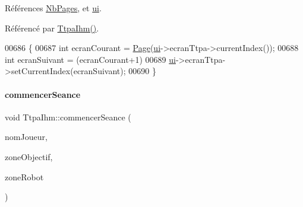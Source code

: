 Références \hyperlink{class_ttpa_ihm_aad886f2c7b90b4f990492092f0be9c2ba66041bd2f2e100691c4d94c918e92956}{Nb\+Pages}, et \hyperlink{class_ttpa_ihm_ad5fae1222a667da158c26f3d0f0dce23}{ui}.



Référencé par \hyperlink{class_ttpa_ihm_ab3ed4b37a93ff04842414d4a98861d66}{Ttpa\+Ihm()}.


\begin{DoxyCode}
00686 \{
00687     \textcolor{keywordtype}{int} ecranCourant = \hyperlink{class_ttpa_ihm_aad886f2c7b90b4f990492092f0be9c2b}{Page}(\hyperlink{class_ttpa_ihm_ad5fae1222a667da158c26f3d0f0dce23}{ui}->ecranTtpa->currentIndex());
00688     \textcolor{keywordtype}{int} ecranSuivant = (ecranCourant+1)%
00689     \hyperlink{class_ttpa_ihm_ad5fae1222a667da158c26f3d0f0dce23}{ui}->ecranTtpa->setCurrentIndex(ecranSuivant);
00690 \}
\end{DoxyCode}
\mbox{\label{class_ttpa_ihm_a9bf7a4cddbdbf786d781e4d084409068}} 
\paragraph{\texorpdfstring{commencer\+Seance}{commencerSeance}}
{\footnotesize\ttfamily void Ttpa\+Ihm\+::commencer\+Seance (\begin{DoxyParamCaption}\item[{Q\+String}]{nom\+Joueur,  }\item[{Q\+String}]{zone\+Objectif,  }\item[{Q\+String}]{zone\+Robot }\end{DoxyParamCaption})\hspace{0.3cm}{\ttfamily [slot]}}



